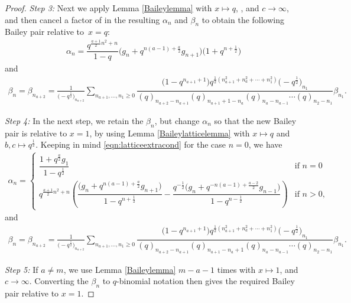 \documentclass[pdftex]{sigma}
\numberwithin{equation}{section}
\begin{document}
\begin{proof}
{\it Step 3\emph{:}}
Next we apply Lemma \ref{Baileylemma} with $x\mapsto q$, , and $c\rightarrow \infty$, and then cancel a factor of  in the resulting $\alpha_n$ and $\beta_n$ to obtain the following Bailey pair relative to~${x=q}$:
\begin{align*}
	\alpha_{n} =
	\dfrac{q^{\frac{a+1}{2}n^2 + n}}{1-q}\bigl(g_n + q^{n(a-1) + \frac{a}{2}}g_{n+1} \bigr)\bigl(1+q^{n+ \frac{1}{2}}\bigr)
\end{align*}
and
\begin{align*}
	\beta_n =\beta_{n_{a+2}}
	=
	\frac{1}{ \bigl(-q^{\frac{1}{2}}\bigr)_{n_{a+2}}}
	\sum_{n_{a+1},\dots,n_1\geq 0}
	\dfrac{\bigl(1-q^{n_{a+1}+1}\bigr)q^{\frac{1}{2}(n_{a+1}^2+n_{a}^2+\cdots+n_1^2)}\bigl(-q^{\frac{1}{2}}\bigr)_{n_1}}{(q)_{n_{a+2}-n_{a+1}}(q)_{n_{a+1}+1-n_{a}}
		(q)_{n_{a}-n_{a-1}}
		\cdots
		(q)_{n_{2}-n_{1}}} \beta_{n_1}.
\end{align*}

{\it Step 4\emph{:}}	In the next step, we retain the $\beta_n$, but change $\alpha_n$ so that the new Bailey pair is relative to $x=1$, by using Lemma \ref{Baileylatticelemma} with $x\mapsto q$ and $b,c\mapsto q^{\frac{1}{2}}$. Keeping in mind \eqref{eqn:latticeextracond} for the case $n=0$, we have
\begin{align*}
	\alpha_{n} =
	\begin{cases}
		\dfrac{1+q^{\frac{a}{2}}g_1}{1-q^{\frac{1}{2}}} & \text{if $n=0$}\\	
		q^{\frac{a+1}{2}n^2+n}\left( \dfrac{\bigl(g_n + q^{n(a-1)+ \frac{a}{2}}g_{n+1}\bigr)}{1-q^{n+\frac{1}{2}}} - \dfrac{q^{-\frac{1}{2}}\bigl(g_n + q^{-n(a-1) + \frac{a-2}{2}}g_{n-1}\bigr)}{1-q^{n - \frac{1}{2}}} \right) & \text{if $n>0$},
	\end{cases}
\end{align*}
and
\begin{align*}
	\beta_n =\beta_{n_{a+2}}
	=
	\frac{1}{ \bigl(-q^{\frac{1}{2}}\bigr)_{n_{a+2}}}
	\sum_{n_{a+1},\dots,n_1\geq 0}
	\dfrac{\bigl(1-q^{n_{a+1}+1}\bigr)q^{\frac{1}{2}(n_{a+1}^2+n_{a}^2+\cdots+n_1^2)}\bigl(-q^{\frac{1}{2}}\bigr)_{n_1}}{(q)_{n_{a+2}-n_{a+1}}(q)_{n_{a+1}-n_{a}+1}
		(q)_{n_{a}-n_{a-1}}
		\cdots
		(q)_{n_{2}-n_{1}}} \beta_{n_1}.
\end{align*}


{\it Step 5\emph{:}}
If $a\neq m$, we use Lemma \ref{Baileylemma} $m-a-1$ times with $x\mapsto 1$,  and $c\rightarrow \infty$. Converting the $\beta_n$ to $q$-binomial notation then gives the required Bailey pair relative to $x=1$.


\end{proof}
\end{document}
